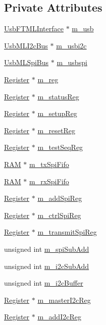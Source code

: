 \subsection*{Private Attributes}
\begin{DoxyCompactItemize}
\item 
\hyperlink{classUsbFTMLInterface}{Usb\+F\+T\+M\+L\+Interface} $\ast$ \hyperlink{classSeqPGA_a3df81bbe0e75a1287aa6fe9d33ea27f5}{m\+\_\+usb}
\item 
\hyperlink{classUsbMLI2cBus}{Usb\+M\+L\+I2c\+Bus} $\ast$ \hyperlink{classSeqPGA_a31d692cdc2f70dfd71671f3e2d688e20}{m\+\_\+usbi2c}
\item 
\hyperlink{classUsbMLSpiBus}{Usb\+M\+L\+Spi\+Bus} $\ast$ \hyperlink{classSeqPGA_aeb7d559e042bced959366125781cef39}{m\+\_\+usbspi}
\item 
\hyperlink{classRegister}{Register} $\ast$ \hyperlink{classSeqPGA_afd827f1d3d55b0a8efafbd79a8c54a52}{m\+\_\+reg}
\item 
\hyperlink{classRegister}{Register} $\ast$ \hyperlink{classSeqPGA_ae39eb15fbde7a4a48376c8cbdbbceeaa}{m\+\_\+status\+Reg}
\item 
\hyperlink{classRegister}{Register} $\ast$ \hyperlink{classSeqPGA_a03269241e7fc26493cd0595beda334c2}{m\+\_\+setup\+Reg}
\item 
\hyperlink{classRegister}{Register} $\ast$ \hyperlink{classSeqPGA_a8c519e98b992ab872622e95dae4461d8}{m\+\_\+reset\+Reg}
\item 
\hyperlink{classRegister}{Register} $\ast$ \hyperlink{classSeqPGA_a7478537516c951a4d08f23b0789ed6d9}{m\+\_\+test\+Seq\+Reg}
\item 
\hyperlink{classRAM}{R\+AM} $\ast$ \hyperlink{classSeqPGA_a6fbdd81928bb5d0fcd671ae2facaef11}{m\+\_\+tx\+Spi\+Fifo}
\item 
\hyperlink{classRAM}{R\+AM} $\ast$ \hyperlink{classSeqPGA_a8ebfe7863e10ab540b5ebecb7655a0d5}{m\+\_\+rx\+Spi\+Fifo}
\item 
\hyperlink{classRegister}{Register} $\ast$ \hyperlink{classSeqPGA_af31d87ad56c501584ccb9c60776a1289}{m\+\_\+add\+Spi\+Reg}
\item 
\hyperlink{classRegister}{Register} $\ast$ \hyperlink{classSeqPGA_ab6597288860f5172540059345256f9a9}{m\+\_\+ctrl\+Spi\+Reg}
\item 
\hyperlink{classRegister}{Register} $\ast$ \hyperlink{classSeqPGA_a4e0ffb37b1cd947d389354ac25723ab8}{m\+\_\+transmit\+Spi\+Reg}
\item 
unsigned int \hyperlink{classSeqPGA_afd5442d9b92f9b59bd553df9bd91dd87}{m\+\_\+spi\+Sub\+Add}
\item 
unsigned int \hyperlink{classSeqPGA_a82bda98edb9681aff47733e83ac8bc4f}{m\+\_\+i2c\+Sub\+Add}
\item 
unsigned int \hyperlink{classSeqPGA_afcef519379e9c6ba624ba58a4eac79f1}{m\+\_\+i2c\+Buffer}
\item 
\hyperlink{classRegister}{Register} $\ast$ \hyperlink{classSeqPGA_a942c71b33a4f43b7a994cb9216abb17e}{m\+\_\+master\+I2c\+Reg}
\item 
\hyperlink{classRegister}{Register} $\ast$ \hyperlink{classSeqPGA_ac3a6aad3fec65ceb78528b6d20deeb3f}{m\+\_\+add\+I2c\+Reg}
\end{DoxyCompactItemize}
